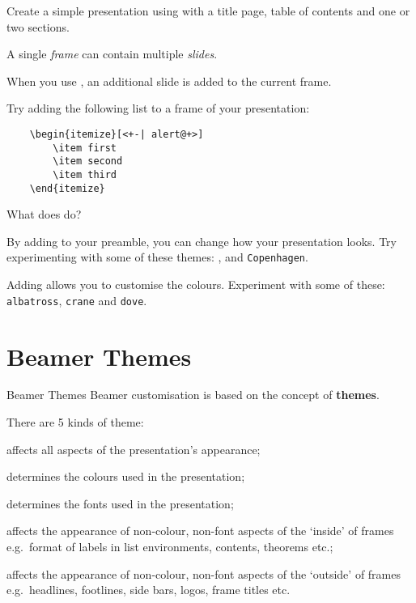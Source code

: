 \begin{exercise}
  Create a simple presentation using  with a title page, table of contents and one or two sections.

  A single \emph{frame} can contain multiple \emph{slides}.

  When you use , an additional slide is added to the current frame.

  Try adding the following list to a frame of your presentation:
  \begin{verbatim}
	\begin{itemize}[<+-| alert@+>]
		\item first
		\item second
		\item third
	\end{itemize}
  \end{verbatim}

  What does  do?

  By adding  to your preamble, you can change how your presentation looks.
  Try experimenting with some of these themes: ,  and \texttt{Copenhagen}.

  Adding  allows you to customise the colours.
  Experiment with some of these: \texttt{albatross}, \texttt{crane} and \texttt{dove}.

\end{exercise}

\section{Beamer Themes}

\begin{frame}{Beamer Themes}
  Beamer customisation is based on the concept of \alert<1>{\textbf{themes}}.

  There are 5 kinds of theme:
  \begin{description}
    \item<1-| alert@2>[presentation] affects all aspects of the presentation's appearance;
    \item<1-| alert@3>[color] determines the colours used in the presentation;
    \item<1-| alert@4>[font] determines the fonts used in the presentation;
    \item<1-| alert@5>[inner] affects the appearance of non-colour, non-font aspects of the ‘inside’ of frames e.g.~format of labels in list environments, contents, theorems etc.;
    \item<1-| alert@6>[outer] affects the appearance of non-colour, non-font aspects of the ‘outside’ of frames e.g.~headlines, footlines, side bars, logos, frame titles etc.
  \end{description}

\end{frame}

